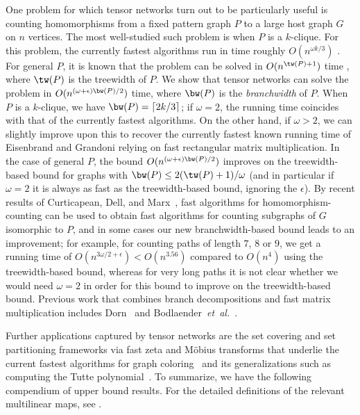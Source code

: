 One problem for which tensor networks turn out to be particularly useful
is counting homomorphisms from a fixed pattern graph $P$ to
a large host graph $G$ on $n$ vertices.  The most well-studied such problem
is when $P$ is a $k$-clique.  For this problem, the currently fastest
algorithms run in time roughly $O(n^{\omega k/3})$
\cite{Nesetril1985,EisenbrandG2004}.  For general $P$, it is known
that the problem can be solved in $O(n^{\tw(P)+1})$ time
\cite{DiazST02}, where $\tw(P)$ is the treewidth of $P$.
We show that tensor networks can solve the problem in $O(n^{(\omega+\epsilon)
  \bw(P)/2})$ time, where $\bw(P)$ is the \emph{branchwidth} of $P$.
When $P$ is a $k$-clique, we have $\bw(P) = \lceil 2k/3\rceil$; if $\omega = 2$,
the running time coincides with that of the currently fastest algorithms.
On the other hand, if $\omega > 2$, we can slightly improve upon this to recover the
currently fastest known running time of
Eisenbrand and Grandoni \cite{EisenbrandG2004} relying on fast rectangular matrix multiplication.
In the case of general $P$, the bound $O(n^{(\omega+\epsilon) \bw(P)/2})$ improves
on the treewidth-based bound for graphs with $\bw(P) \le
2(\tw(P)+1)/\omega$ (and in particular if $\omega=2$ it is always as
fast as the treewidth-based bound, ignoring the $\epsilon$).  By
recent results of Curticapean, Dell, and Marx~\cite{CurticapeanDM2017},
fast algorithms for homomorphism-counting can be used to obtain fast
algorithms for counting subgraphs of $G$ isomorphic to $P$, and in
some cases our new branchwidth-based bound leads to an improvement;
for example, for counting paths %
of length $7$, $8$ or $9$,
we get a running time of $O(n^{3\omega/2+\epsilon}) < O(n^{3.56})$
compared to $O(n^{4})$ using the treewidth-based bound, whereas for very long
paths it is not clear whether we would need $\omega=2$ in order for
%
this bound %
to improve on the treewidth-based bound. Previous work
that combines branch decompositions and fast matrix
multiplication includes Dorn~\cite{Dorn2006} and
Bodlaender~\emph{et~al.}~\cite{BodlaenderLRV2010}.

Further applications
captured by tensor networks are the set covering and set partitioning
frameworks via fast zeta and M\"obius transforms that underlie the
current fastest algorithms for graph coloring~\cite{BjorklundHK2009}
and its generalizations such as computing the
Tutte polynomial~\cite{BjorklundHKK2007,BjorklundHKK2008}.
To summarize, we have the following compendium
%
of upper bound results.
For the detailed definitions of the relevant multilinear maps,
%
%
see  . %


